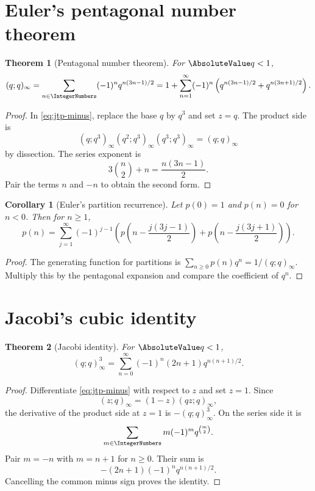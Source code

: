 \documentclass[11pt,a4paper,oneside,openany]{book}
\newtheorem{theorem}{Theorem}[chapter]
\newtheorem{corollary}[corollary]{Corollary}
\theoremstyle{definition}
\theoremstyle{remark}
\begin{document}
\section{Euler's pentagonal number theorem}

\begin{theorem}[Pentagonal number theorem]\label{thm:pentagonal}
For $\AbsoluteValue q<1$,
\[
 (q;q)_\infty
 =\sum_{n\in\IntegerNumbers}(-1)^nq^{n(3n-1)/2}
 =1+\sum_{n=1}^{\infty}(-1)^n
 \left(q^{n(3n-1)/2}+q^{n(3n+1)/2}\right).
\]
\end{theorem}

\begin{proof}
In \eqref{eq:jtp-minus}, replace the base $q$ by $q^3$ and set $z=q$.  The product side is
\[
 (q;q^3)_\infty(q^2;q^3)_\infty(q^3;q^3)_\infty=(q;q)_\infty
\]
by dissection.  The series exponent is
\[
 3\binom n2+n=\frac{n(3n-1)}2.
\]
Pair the terms $n$ and $-n$ to obtain the second form.
\end{proof}

\begin{corollary}[Euler's partition recurrence]\label{cor:euler-partition-recurrence}
Let $p(0)=1$ and $p(n)=0$ for $n<0$.  Then for $n\ge1$,
\[
 p(n)=\sum_{j=1}^{\infty}(-1)^{j-1}
 \left(p\!\left(n-\frac{j(3j-1)}2\right)
 +p\!\left(n-\frac{j(3j+1)}2\right)\right).
\]
\end{corollary}

\begin{proof}
The generating function for partitions is
\(
 \sum_{n\ge0}p(n)q^n=1/(q;q)_\infty.
\)
Multiply this by the pentagonal expansion and compare the coefficient of $q^n$.
\end{proof}

\section{Jacobi's cubic identity}

\begin{theorem}[Jacobi identity]\label{thm:jacobi-cubic}
For $\AbsoluteValue q<1$,
\[
 (q;q)_\infty^3
 =\sum_{n=0}^{\infty}(-1)^n(2n+1)q^{n(n+1)/2}.
\]
\end{theorem}

\begin{proof}
Differentiate \eqref{eq:jtp-minus} with respect to $z$ and set $z=1$.  Since
\[
 (z;q)_\infty=(1-z)(qz;q)_\infty,
\]
the derivative of the product side at $z=1$ is $-(q;q)_\infty^3$.  On the series side it is
\[
 \sum_{m\in\IntegerNumbers}m(-1)^mq^{\binom m2}.
\]
Pair $m=-n$ with $m=n+1$ for $n\ge0$.  Their sum is
\[
 -(2n+1)(-1)^nq^{n(n+1)/2}.
\]
Cancelling the common minus sign proves the identity.
\end{proof}
\end{document}
